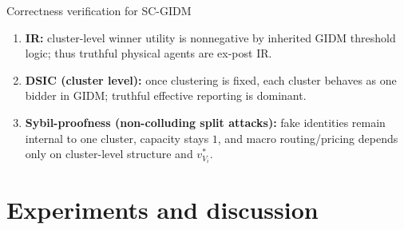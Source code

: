 \documentclass[10pt,aspectratio=169]{beamer}
\newcommand{\greenblock}[2]{\begin{exampleblock}{#1}#2\end{exampleblock}}
\begin{document}
\begin{frame}{Correctness verification for SC-GIDM}

\vspace{1mm}
\begin{enumerate}
  \item \textbf{IR:} cluster-level winner utility is nonnegative by inherited GIDM threshold logic; thus truthful physical agents are ex-post IR.
  \item \textbf{DSIC (cluster level):} once clustering is fixed, each cluster behaves as one bidder in GIDM; truthful effective reporting is dominant.
  \item \textbf{Sybil-proofness (non-colluding split attacks):} fake identities remain internal to one cluster, capacity stays $1$, and macro routing/pricing depends only on cluster-level structure and $v^*_{V_i}$.
\end{enumerate}

\end{frame}


\section{Experiments and discussion}
\end{document}
